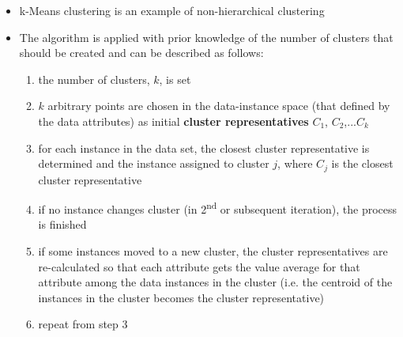 \begin{itemize}
\item k-Means clustering is an example of non-hierarchical clustering
\item The algorithm is applied with prior knowledge of the number of clusters that should be created and can be described as follows:
  \begin{enumerate}
  \item the number of clusters, $k$, is set
  \item $k$ arbitrary points are chosen in the data-instance space (that defined by the data attributes) as initial \textbf{cluster representatives} $C_1$, $C_2$,...$C_k$
  \item for each instance in the data set, the closest cluster representative is determined and the instance assigned to cluster $j$, where $C_j$ is the closest cluster representative
    \item if no instance changes cluster (in 2\textsuperscript{nd} or subsequent iteration), the process is finished 
  \item if some instances moved to a new cluster, the cluster representatives are re-calculated so that each attribute gets the value average for that attribute among the data instances in the cluster (i.e. the centroid of the instances in the cluster becomes the cluster representative)
    \item repeat from step 3
  \end{enumerate}
\end{itemize}
\newpage

